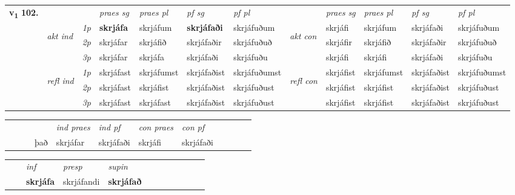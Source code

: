 \begin{tabular}{llllllllllll} \toprule
\multirow{4}{*}{{{\textbf{v{\textsubscript{1}}} \Large{\textbf{102.}}}}}  & &   &  \textit{praes sg}  & \textit{praes pl}  &\textit{ pf sg} & \textit{pf pl} &  &  \textit{praes sg}  & \textit{praes pl}  & \textit{pf sg} & \textit{pf pl } \\*
	\cmidrule{4-7} \cmidrule{9-12}
 & \multirow{3}{*}{\begin{turn}{90}\textit{akt ind}\end{turn}} & {\textit{1p}} & \textbf{skrjáfa} & skrjáfum    & \textbf{skrjáfaði} & skrjáfuðum & \multirow{3}{*}{\begin{turn}{90}\textit{akt con}\end{turn}} &skrjáfi & skrjáfum & skrjáfaði & skrjáfuðum\\*
& &  {\textit{2p}} &  skrjáfar  & skrjáfið   & skrjáfaðir & skrjáfuðuð & & skrjáfir & skrjáfið & skrjáfaðir & skrjáfuðuð \\*
& &  {\textit{3p}} & skrjáfar & skrjáfa   & skrjáfaði & skrjáfuðu & & skrjáfi & skrjáfi& skrjáfaði & skrjáfuðu  \\*
\cmidrule{4-7} \cmidrule{9-12}
 &\multirow{3}{*}{\begin{turn}{90}\textit{refl ind}\end{turn}} & {\textit{1p}} & skrjáfast & skrjáfumst    & skrjáfaðist & skrjáfuðumst & \multirow{3}{*}{\begin{turn}{90}\textit{refl con}\end{turn}}  &skrjáfist & skrjáfumst & skrjáfaðist & skrjáfuðumst\\*
 &&  {\textit{2p}} &  skrjáfast  & skrjáfist   & skrjáfaðist & skrjáfuðust & &skrjáfist & skrjáfist & skrjáfaðist & skrjáfuðust \\*
& &  {\textit{3p}} & skrjáfast & skrjáfast   & skrjáfaðist & skrjáfuðust & & skrjáfist & skrjáfist& skrjáfaðist & skrjáfuðust  \\*
\cmidrule{4-7} \cmidrule{9-12}
\end{tabular}


\begin{tabular}{llllllllllll}
 & &  & &  \textit{ind praes} & \textit{ind pf} & \textit{con praes} & \textit{con pf} \\*
&  & & það & skrjáfar & skrjáfaði & skrjáfi & skrjáfaði \\*
\cmidrule{5-9}
\end{tabular}


\begin{tabular}{llllllllllll}
 & & \textit{inf}     & \textit{presp} & \textit{supin}       \\*
  & & \textbf{skrjáfa}      & skrjáfandi &  \textbf{skrjáfað}   \\*
\cmidrule{1-12}
\end{tabular}





